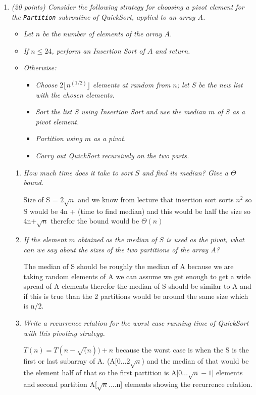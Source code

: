 \documentclass[12pt]{article}
\begin{document}
\begin{enumerate}
    \item\textit{ (20 points) Consider the following strategy for choosing a pivot element for the {\tt Partition} subroutine of QuickSort, applied to an array $A$.}
    \begin{itemize}
    	\item\textit{ Let $n$ be the number of elements of the array $A$.}
    	\item \textit{If $n\leq 24$, perform an Insertion Sort of $A$ and return.}
    	\item \textit{Otherwise:}
    	\begin{itemize}
    		\item\textit{ Choose $2\lfloor n^{(1/2)} \rfloor$ elements at random from $n$; let $S$ be the new list with the chosen elements.}
    		\item \textit{Sort the list $S$ using Insertion Sort and use the median $m$ of $S$ as a pivot element.}
    		\item \textit{Partition using $m$ as a pivot.}
    		\item \textit{Carry out QuickSort recursively on the two parts.}
    	\end{itemize}
    \end{itemize}
    \begin{enumerate}
    	\item\textit{ How much time does it take to sort $S$ and find its median? Give a $\Theta$ bound.}

	Size of S = $2\sqrt{n}$ and we know from lecture that insertion sort sorts $n^2$ so S would be 4n + (time to find median) and this would be half the size so 4n+$\sqrt{n}$ therefor the bound would be $\Theta(n)$
    	\item \textit{If the element $m$ obtained as the median of $S$ is used as the pivot, what can we say about the sizes of the two partitions of the array $A$?}

The median of S should be roughly the median of A because we are taking random elements of A we can assume we get enough to get a wide spread of A elements therefor the median of S should be similar to A and if this is true than the 2 partitions would be around the same size which is n/2.

    	\item\textit{ Write a recurrence relation for the worst case running time of QuickSort with this pivoting strategy.}

$T(n) = T(n-\sqrt(n)) + n$ because the worst case is when the S is the first or last subarray of A. (A[0...$2\sqrt{n}$) and the median of that would be the element half of that so the first partition is A[0...$\sqrt{n}-1$] elements and second partition A[$\sqrt{n}$....n] elements  showing the recurrence relation.

    \end{enumerate}

\end{enumerate}
\end{document}
